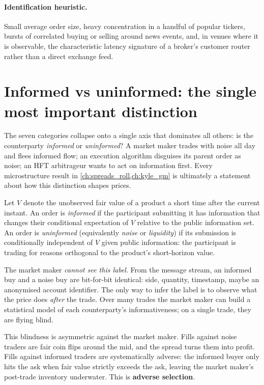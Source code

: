 \paragraph{Identification heuristic.} Small average order size,
heavy concentration in a handful of popular tickers, bursts of
correlated buying or selling around news events, and, in venues where
it is observable, the characteristic latency signature of a broker's
customer router rather than a direct exchange feed.

\section{Informed vs uninformed: the single most important distinction}
\label{sec:informed_vs_uninformed}

The seven categories collapse onto a single axis that dominates all
others: is the counterparty \emph{informed} or \emph{uninformed}? A
market maker trades with noise all day and flees informed flow; an
execution algorithm disguises its parent order as noise; an HFT
arbitrageur wants to act on information first. Every microstructure
result in \cref{ch:spreads_roll,ch:kyle_gm} is ultimately a statement
about how this distinction shapes prices.

\begin{definition}
Let $V$ denote the unobserved fair value of a product a short time
after the current instant. An order is \emph{informed} if the
participant submitting it has information that changes their
conditional expectation of $V$ relative to the public information set.
An order is \emph{uninformed} (equivalently \emph{noise} or
\emph{liquidity}) if its submission is conditionally independent of
$V$ given public information: the participant is trading for reasons
orthogonal to the product's short-horizon value.
\end{definition}

The market maker \emph{cannot see this label}. From the message
stream, an informed buy and a noise buy are bit-for-bit identical:
side, quantity, timestamp, maybe an anonymised account identifier.
The only way to infer the label is to observe what the price does
\emph{after} the trade. Over many trades the market maker can build a
statistical model of each counterparty's informativeness; on a single
trade, they are flying blind.

This blindness is asymmetric against the market maker. Fills against
noise traders are fair coin flips around the mid, and the spread
turns them into profit. Fills against informed traders are
systematically adverse: the informed buyer only hits the ask when
fair value strictly exceeds the ask, leaving the market maker's
post-trade inventory underwater. This is \textbf{adverse
selection}.

